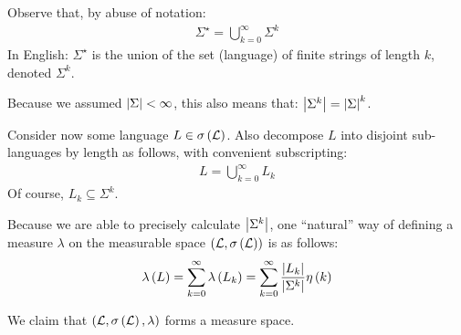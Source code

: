 Observe that, by abuse of notation:
\begin{align*}
  \Sigma^\star =
    \bigcup_{k = 0}^{\infty} \Sigma^k
\end{align*}
In English: \(\Sigma^\star\) is the union of the set (language) of finite
strings of length \(k\), denoted \(\Sigma^k\).

Because we assumed \(\left\lvert\Sigma\right\rvert < \infty\), this also means that:
\(\left\lvert\Sigma^k\right\rvert = \left\lvert\Sigma\right\rvert^k\).

Consider now some language \(L \in \sigma\left(\mathcal{L}\right)\).
Also decompose \(L\) into disjoint sub-languages by length as follows,
with convenient subscripting:
\begin{align*}
  L = \bigcup_{k = 0}^{\infty} L_k
\end{align*}
Of course, \(L_k \subseteq \Sigma^k\).

Because we are able to precisely calculate \(\left\lvert\Sigma^k\right\rvert\),
one ``natural'' way of defining a measure \(\lambda\) on
the measurable space \(\left(\mathcal{L}, \sigma\left(\mathcal{L}\right)\right)\)
is as follows:
\begin{align*}
  \lambda\left(L\right)
    = \sum_{k = 0}^{\infty} \lambda\left(L_k\right)
    = \sum_{k = 0}^{\infty} \frac{\left\lvert L_k\right\rvert}{\left\lvert\Sigma^k\right\rvert} \eta\left(k\right)
\end{align*}

We claim that \(\left(\mathcal{L}, \sigma\left(\mathcal{L}\right), \lambda\right)\)
forms a measure space.

